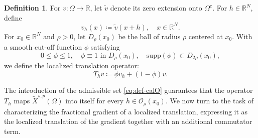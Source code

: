 \documentclass[]{amsart}
\theoremstyle{definition}
\theoremstyle{definition}
\newtheorem{definition}[theorem]{Definition}
\theoremstyle{remark}
\numberwithin{equation}{section}
\begin{document}
	\begin{definition}
		\label{Regularidad: Operador de Traslación Localizada}
		For \( v\colon \Omega \to \mathbb{R} \), let \(\tilde{v}\) denote its zero extension onto $\Omega^c$. For \( h \in \mathbb{R}^N \), define
		\[
		v_h(x) \coloneq \tilde{v}(x + h), \quad x \in \mathbb{R}^N.
		\]
		For \( x_0 \in \mathbb{R}^N \) and \( \rho > 0 \), let \( D_\rho(x_0) \) be the ball of radius \( \rho \) centered at \( x_0 \). With a smooth cut-off function \( \phi \) satisfying
		\[
		0 \leq \phi \leq 1, \quad \phi \equiv 1 \text{ in } D_\rho(x_0), \quad \text{supp}(\phi) \subset D_{2\rho}(x_0),
		\]
		we define the localized translation operator:
		\[
		T_h v \coloneq \phi v_h + (1 - \phi)v.
		\]
	\end{definition}
The introduction of the admissible set \eqref{eq:def-calO} guarantees that the operator \( T_h \) maps \( \widetilde{X}^{s,p}(\Omega) \) into itself for every \( h \in \mathcal{O}_\rho(x_0) \). We now turn to the task of characterizing the fractional gradient of a localized translation, expressing it as the localized translation of the gradient together with an additional commutator term.
\end{document}
